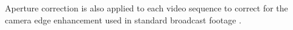 Aperture correction is also applied to each video sequence to correct for the camera edge enhancement
used in standard broadcast footage \cite{iview}.






